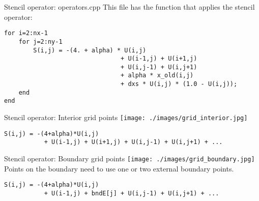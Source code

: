 \documentclass[aspectratio=43]{beamer}
\begin{document}
\begin{frame}[fragile]{Stencil operator: operators.cpp}
    This file has the function that applies the stencil operator:

\begin{lstlisting}[style=boxcudatiny]
for i=2:nx-1
    for j=2:ny-1
        S(i,j) = -(4. + alpha) * U(i,j)
                                + U(i-1,j) + U(i+1,j)
                                + U(i,j-1) + U(i,j+1)
                                + alpha * x_old(i,j)
                                + dxs * U(i,j) * (1.0 - U(i,j));
    end
end
\end{lstlisting}
\end{frame}

\begin{frame}[fragile]{Stencil operator: Interior grid points}
    \texttt{[image: ./images/grid\_interior.jpg]} \\
\begin{lstlisting}[style=boxcudatiny]
    S(i,j) = -(4+alpha)*U(i,j)
           + U(i-1,j) + U(i+1,j) + U(i,j-1) + U(i,j+1) + ...
\end{lstlisting}
\end{frame}

\begin{frame}[fragile]{Stencil operator: Boundary grid points}
    \texttt{[image: ./images/grid\_boundary.jpg]} \\
    Points on the boundary need to use one or two external boundary points. \\
\begin{lstlisting}[style=boxcudatiny]
    S(i,j) = -(4+alpha)*U(i,j)
           + U(i-1,j) + bndE[j] + U(i,j-1) + U(i,j+1) + ...
\end{lstlisting}
\end{frame}
\end{document}
